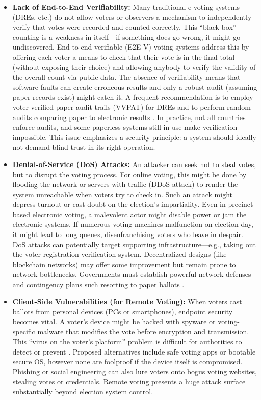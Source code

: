 \documentclass[a4paper,10pt]{report}
\begin{document}
\begin{itemize}
     \item \textbf {Lack of End-to-End Verifiability:}  Many traditional e-voting systems (DREs, etc.) do not allow voters or observers a mechanism to independently verify that votes were recorded and counted correctly.  This “black box” counting is a weakness in itself---if something does go wrong, it might go undiscovered.  End-to-end verifiable (E2E-V) voting systems address this by offering each voter a means to check that their vote is in the final total (without exposing their choice) and allowing anybody to verify the validity of the overall count via public data.  The absence of verifiability means that software faults can create erroneous results and only a robust audit (assuming paper records exist) might catch it.  A frequent recommendation is to employ voter-verified paper audit trails (VVPAT) for DREs and to perform random audits comparing paper to electronic results \cite{brookings2017audits}.  In practice, not all countries enforce audits, and some paperless systems still in use make verification impossible.  This issue emphasizes a security principle: a system should ideally not demand blind trust in its right operation.
    
     \item \textbf {Denial-of-Service (DoS) Attacks:}  An attacker can seek not to steal votes, but to disrupt the voting process.  For online voting, this might be done by flooding the network or servers with traffic (DDoS attack) to render the system unreachable when voters try to check in.  Such an attack might depress turnout or cast doubt on the election’s impartiality.  Even in precinct-based electronic voting, a malevolent actor might disable power or jam the electronic systems.  If numerous voting machines malfunction on election day, it might lead to long queues, disenfranchising voters who leave in despair.  DoS attacks can potentially target supporting infrastructure—e.g., taking out the voter registration verification system.  Decentralized designs (like blockchain networks) may offer some improvement but remain prone to network bottlenecks.  Governments must establish powerful network defenses and contingency plans such resorting to paper ballots \cite{dos_attack_electronics}.
    
     \item \textbf {Client-Side Vulnerabilities (for Remote Voting):}  When voters cast ballots from personal devices (PCs or smartphones), endpoint security becomes vital.  A voter’s device might be hacked with spyware or voting-specific malware that modifies the vote before encryption and transmission.  This “virus on the voter’s platform” problem is difficult for authorities to detect or prevent \cite{dc_voting_trial}.  Proposed alternatives include safe voting apps or bootable secure OS, however none are foolproof if the device itself is compromised.  Phishing or social engineering can also lure voters onto bogus voting websites, stealing votes or credentials.  Remote voting presents a huge attack surface substantially beyond election system control.
    

\end{itemize}
\end{document}
